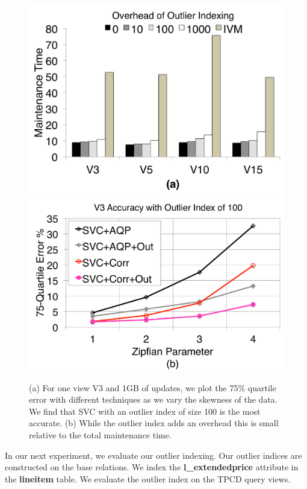 \begin{figure}[t]
\centering
 \includegraphics[scale=0.14]{exp/msoi_1.pdf}
 \includegraphics[scale=0.14]{exp/msoi_2.pdf}
 \caption{(a) For one view V3 and 1GB of updates, we plot the 75\% quartile error with different techniques as we vary the skewness of the data. We find that SVC with an outlier index of size 100 is the most accurate. (b) While the outlier index adds an overhead this is small relative to the total maintenance time. \label{exp5-oi}}
\end{figure}
In our next experiment, we evaluate our outlier indexing.
Our outlier indices are constructed on the base relations.
We index the \textbf{l\_extendedprice} attribute in the \textbf{lineitem} table.
We evaluate the outlier index on the TPCD query views.


